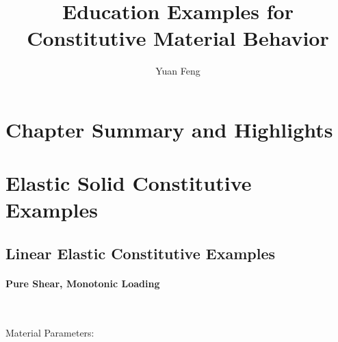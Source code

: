\documentclass[fleqn,11pt]{article}
\title{Education Examples for Constitutive Material Behavior}
\author{Yuan Feng}
\begin{document}
\thispagestyle{fancy}
\maketitle


\section{Chapter Summary and Highlights}






\section{Elastic Solid Constitutive Examples}


\newpage
\subsection{Linear Elastic Constitutive Examples}

\paragraph{Pure Shear, Monotonic Loading} ~ 

Material Parameters:

\end{document}
